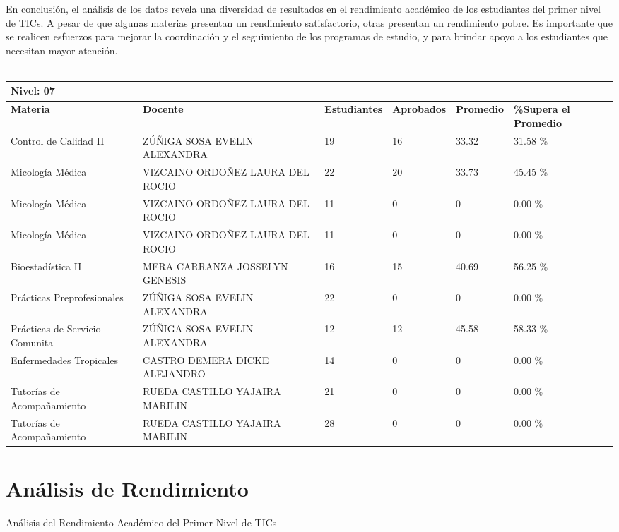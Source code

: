 En conclusión, el análisis de los datos revela una diversidad de resultados en el rendimiento académico de los estudiantes del primer nivel de TICs. A pesar de que algunas materias presentan un rendimiento satisfactorio, otras presentan un rendimiento pobre. Es importante que se realicen esfuerzos para mejorar la coordinación y el seguimiento de los programas de estudio, y para brindar apoyo a los estudiantes que necesitan mayor atención.\\
\vspace{1cm}\\\small
\begin{tabularx}{\textwidth}{|p{2.5cm}|p{2.5cm}|X|X|X|X|}
\hline
\multicolumn{6}{|X|}{\textbf{Nivel: 07 }}\\\hline\textbf{Materia} & \textbf{Docente} & \textbf{Estudiantes} & \textbf{Aprobados} & \textbf{Promedio} & \textbf{\%Supera el Promedio} \\ \hline
Control de Calidad II & ZÚÑIGA SOSA EVELIN ALEXANDRA & 19 & 16 & 33.32 & 31.58 \%\\ \hline
Micología Médica & VIZCAINO ORDOÑEZ LAURA DEL ROCIO  & 22 & 20 & 33.73 & 45.45 \%\\ \hline
Micología Médica & VIZCAINO ORDOÑEZ LAURA DEL ROCIO  & 11 & 0 & 0 & 0.00 \%\\ \hline
Micología Médica & VIZCAINO ORDOÑEZ LAURA DEL ROCIO  & 11 & 0 & 0 & 0.00 \%\\ \hline
Bioestadística II & MERA CARRANZA JOSSELYN GENESIS & 16 & 15 & 40.69 & 56.25 \%\\ \hline
Prácticas Preprofesionales & ZÚÑIGA SOSA EVELIN ALEXANDRA & 22 & 0 & 0 & 0.00 \%\\ \hline
Prácticas de Servicio Comunita & ZÚÑIGA SOSA EVELIN ALEXANDRA & 12 & 12 & 45.58 & 58.33 \%\\ \hline
Enfermedades Tropicales & CASTRO DEMERA DICKE ALEJANDRO & 14 & 0 & 0 & 0.00 \%\\ \hline
Tutorías de Acompañamiento & RUEDA CASTILLO YAJAIRA MARILIN & 21 & 0 & 0 & 0.00 \%\\ \hline
Tutorías de Acompañamiento & RUEDA CASTILLO YAJAIRA MARILIN & 28 & 0 & 0 & 0.00 \%\\ \hline
\end{tabularx}

\vspace{1cm}
\section{Análisis de Rendimiento}
Análisis del Rendimiento Académico del Primer Nivel de TICs

